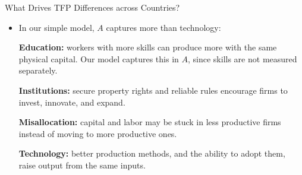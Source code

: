 \documentclass[10pt,aspectratio=169]{beamer}
\begin{document}
\begin{frame}{What Drives TFP Differences across Countries?}
\begin{itemize}
    \item In our simple model, \(A\) captures more than technology:

    \itemvso \textbf{Education:} workers with more skills can produce more with the same physical capital. Our model captures this in \(A\), since skills are not measured separately.

    \itemvso \textbf{Institutions:} secure property rights and reliable rules encourage firms to invest, innovate, and expand.

    \itemvso \textbf{Misallocation:} capital and labor may be stuck in less productive firms instead of moving to more productive ones.

    \itemvso \textbf{Technology:} better production methods, and the ability to adopt them, raise output from the same inputs.
\end{itemize}
\end{frame}
\end{document}
